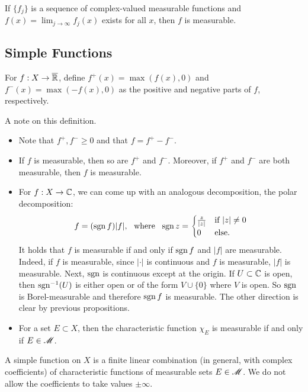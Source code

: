 \documentclass[12pt]{article} %
\begin{document}
\begin{corollary}
    If $\{f_j\}$ is a sequence of complex-valued measurable functions and $f(x) = \lim_{j \to \infty} f_j(x)$ exists for all $x$, then $f$ is measurable.
\end{corollary}

\subsection{Simple Functions}

\begin{definition}
    For $f : X \to \overline{\mathbb{R}}$, define $f^+(x) = \max(f(x), 0)$ and $f^-(x) = \max(-f(x), 0)$ as the positive and negative parts of $f$, respectively. 
\end{definition}

\begin{remark}
    A note on this definition.
    \begin{itemize}
        \item Note that $f^+, f^- \geq 0$ and that $f = f^+ - f^-$.
        \item If $f$ is measurable, then so are $f^+$ and $f^-$. Moreover, if $f^+$ and $f^-$ are both measurable, then $f$ is measurable.
        \item For $f : X \to \mathbb{C}$, we can come up with an analogous decomposition, the polar decomposition: \[f = (\operatorname{sgn} f) |f|, \ \ \text{where} \ \ \operatorname{sgn} z = \begin{cases}
            \frac{z}{|z|} &\text{if} \ |z| \neq 0\\
            0 &\text{else}.
        \end{cases}\] It holds that $f$ is measurable if and only if $\operatorname{sgn} f$ and $|f|$ are measurable. Indeed, if $f$ is measurable, since $|\cdot|$ is continuous and $f$ is measurable, $|f|$ is measurable. Next, $\operatorname{sgn}$ is continuous except at the origin. If $U \subset \mathbb{C}$ is open, then $\operatorname{sgn}^{-1}(U)$ is either open or of the form $V \cup \{0\}$ where $V$ is open. So $\operatorname{sgn}$ is Borel-measurable and therefore $\operatorname{sgn} f$ is measurable. The other direction is clear by previous propositions.
        \item For a set $E \subset X$, then the characteristic function $\chi_E$ is measurable if and only if $E \in \mathscr{M}$.
    \end{itemize}
\end{remark}

\begin{definition}
    A simple function on $X$ is a finite linear combination (in general, with complex coefficients) of characteristic functions of measurable sets $E \in \mathscr{M}$. We do not allow the coefficients to take values $\pm \infty$.
\end{definition}
\end{document}
